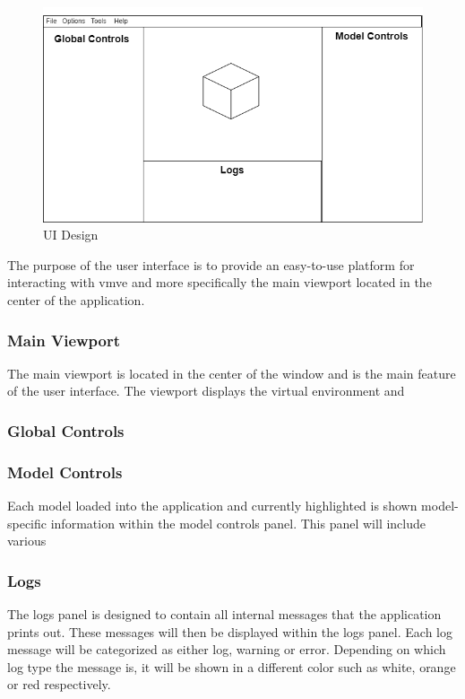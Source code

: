 \documentclass[11pt]{article}
\begin{document}
\begin{figure}[H]
  \centering
  \includegraphics[width=\textwidth]{images/ui_design.png}
  \caption{UI Design}
  \label{fig:ui_design}
\end{figure}

The purpose of the user interface is to provide an easy-to-use platform for
interacting with \gls*{vmve} and more specifically the main viewport located in
the center of the application.

\subsubsection{Main Viewport}
The main viewport is located in the center of the window and is the main feature
of the user interface. The viewport displays the virtual environment and 

\subsubsection{Global Controls}

\subsubsection{Model Controls}

Each model loaded into the application and currently highlighted is shown
model-specific information within the model controls panel. This panel will include various 


\subsubsection{Logs}
The logs panel is designed to contain all internal messages that the application
prints out. These messages will then be displayed within the logs panel. Each
log message will be categorized as either log, warning or error. Depending on
which log type the message is, it will be shown in a different color such as
white, orange or red respectively.
\end{document}
